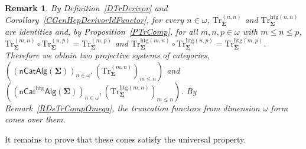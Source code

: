 \documentclass[a4paper, reqno]{amsbook}
\newcommand{\sig}[1]{\mathbf{#1}}             %
\newcommand{\htg}{\mathrm{htg}}                %
\newcommand{\Tr}{\mathrm{Tr}}
\theoremstyle{plain}
\newtheorem{remark}[theorem]{Remark}
\theoremstyle{definition}
\begin{document}
\begin{remark}\label{RTrProjSystem}
By Definition~\ref{DTrDerivor} and Corollary~\ref{CGenHepDerivorIdFunctor}, for every $n\in\omega$, $\Tr^{(n,n)}_{\sig{\Sigma}}$ and $\Tr^{\htg(n,n)}_{\sig{\Sigma}}$ are identities and, by Proposition~\ref{PTrComp}, for all $m,n,p\in\omega$ with $m\leq n\leq p$, $\Tr^{(m,n)}_{\sig{\Sigma}}\circ \Tr^{(n,p)}_{\sig{\Sigma}}=\Tr^{(m,p)}_{\sig{\Sigma}}$ and $\Tr^{\htg(m,n)}_{\sig{\Sigma}}\circ \Tr^{\htg(n,p)}_{\sig{\Sigma}}=\Tr^{\htg(m,p)}_{\sig{\Sigma}}$.
Therefore we obtain two projective systems of categories, $((\mathsf{nCatAlg}(\sig{\Sigma}))_{n\in\omega},(\Tr^{(m,n)}_{\sig{\Sigma}})_{m\leq n})$ and $((\mathsf{nCat}^{\htg}\mathsf{Alg}(\sig{\Sigma}))_{n\in\omega},(\Tr^{\htg(m,n)}_{\sig{\Sigma}})_{m\leq n})$.
By Remark~\ref{RDsTrCompOmega}, the truncation functors from dimension $\omega$ form cones over them.
\end{remark}

It remains to prove that these cones satisfy the universal property.
\end{document}
